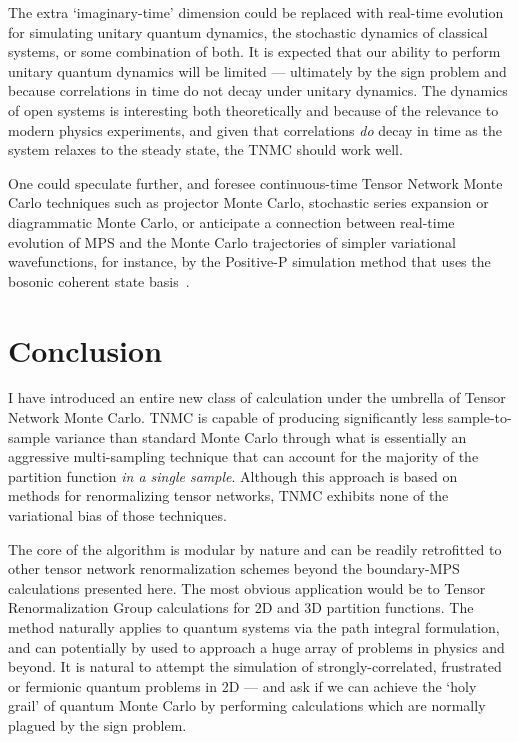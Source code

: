 \documentclass[aps,prl,nopacs,twocolumn]{revtex4}
\begin{document}
The extra `imaginary-time' dimension could be replaced with real-time evolution for simulating unitary quantum dynamics, the stochastic dynamics of classical systems, or some combination of both. It is expected that our ability to perform unitary quantum dynamics will be limited --- ultimately by the sign problem and because correlations in time do not decay under unitary dynamics. The dynamics of open systems is interesting both theoretically and because of the relevance to modern physics experiments, and given that correlations \emph{do} decay in time as the system relaxes to the steady state, the TNMC should work well.

One could speculate further, and foresee continuous-time Tensor Network Monte Carlo techniques such as projector Monte Carlo, stochastic series expansion or diagrammatic Monte Carlo, or anticipate a connection between real-time evolution of MPS and the Monte Carlo trajectories of simpler variational wavefunctions, for instance, by the Positive-P simulation method that uses the bosonic coherent state basis~\cite{Drummond1980}.

\section{Conclusion}

I have introduced an entire new class of calculation under the umbrella of Tensor Network Monte Carlo. TNMC is capable of producing significantly less sample-to-sample variance than standard Monte Carlo through what is essentially an aggressive multi-sampling technique that can account for the majority of the partition function \emph{in a single sample}. Although this approach is based on methods for renormalizing tensor networks, TNMC exhibits none of the variational bias of those techniques. 

The core of the algorithm is modular by nature and can be readily retrofitted to other tensor network renormalization schemes beyond the boundary-MPS calculations presented here. The most obvious application would be to Tensor Renormalization Group calculations for 2D and 3D partition functions. The method naturally applies to quantum systems via the path integral formulation, and can potentially by used to approach a huge array of problems in physics and beyond. It is natural to attempt the simulation of strongly-correlated, frustrated or fermionic quantum problems in 2D --- and ask if we can achieve the `holy grail' of quantum Monte Carlo by performing calculations which are normally plagued by the sign problem.
\end{document}
